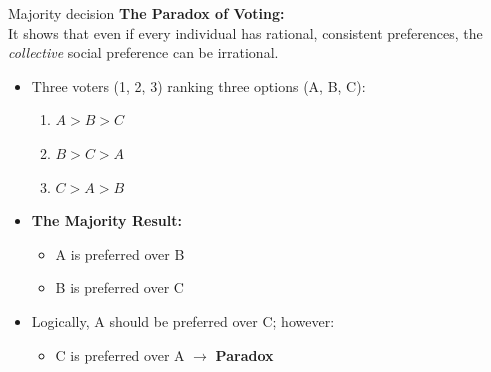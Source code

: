 \documentclass{beamer}
\begin{document}
\begin{frame}{Majority decision}
    \textbf{The Paradox of Voting:}\\
      It shows that even if every individual has rational, consistent preferences, the \textit{collective} social preference can be irrational.
    \vspace{0.5 cm}
    \begin{itemize}
        \item Three voters (1, 2, 3) ranking three options (A, B, C):
        \begin{enumerate}
            \item $A > B > C$
            \item $B > C > A$
            \item $C > A > B$
        \end{enumerate}
        \item \textbf{The Majority Result:} 
        \begin{itemize}
            \item A is preferred over B
            \item B is preferred over C
        \end{itemize}
        \item[$\Rightarrow$] Logically, A should be preferred over C; however:
        \begin{itemize}
            \item C is preferred over A $\rightarrow$ \textbf{Paradox}
        \end{itemize}
    \end{itemize}

    
\end{frame}
\end{document}
